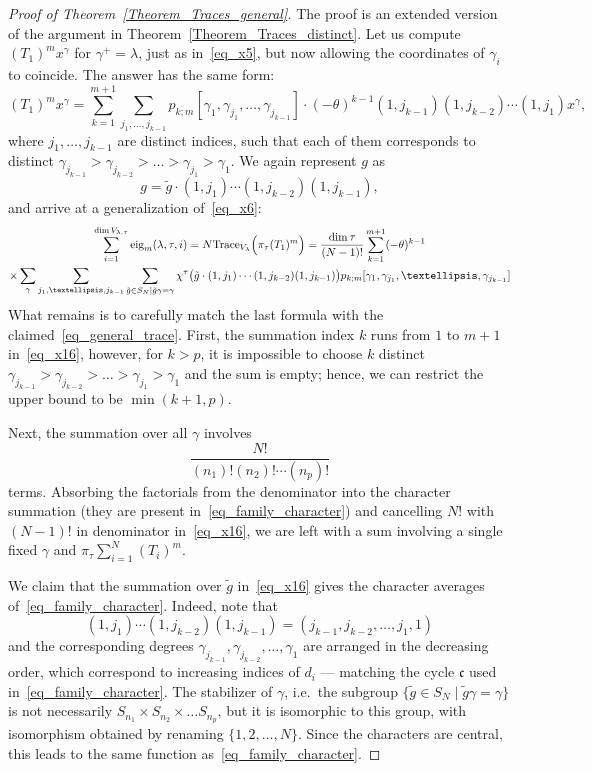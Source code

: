 \documentclass[11pt]{article}
\theoremstyle{definition}
\numberwithin{equation}{section}
\begin{document}
\begin{proof}[Proof of Theorem~\ref{Theorem_Traces_general}]
The proof is an extended version of the argument in Theorem~\ref{Theorem_Traces_distinct}. Let us compute $(T_1)^m x^{\gamma}$ for $\gamma^+=\lambda$, just as in~\eqref{eq_x5}, but now allowing the coordinates of $\gamma_i$ to coincide. The answer has the same form:
\begin{equation}
 (T_1)^m x^{\gamma}=\sum_{k=1}^{m+1}\sum_{j_1,\dots,j_{k-1}} p_{k;m}[\gamma_1,\gamma_{j_1},\dots,\gamma_{j_{k-1}}]\cdot  (-\theta)^{k-1}(1,j_{k-1})(1, j_{k-2})\cdots (1,j_{1}) x^{\gamma},
\end{equation}
where $j_1,\dots,j_{k-1}$ are distinct indices, such that each of them corresponds to distinct $\gamma_{j_{k-1}}>\gamma_{j_{k-2}}>\dots>\gamma_{j_{1}}>\gamma_1$. We again represent $g$ as
$$
 g=\tilde g\cdot  (1,j_{1})  \cdots (1,j_{k-2})(1, j_{k-1}),
$$
and arrive at a generalization of~\eqref{eq_x6}:
\begin{multline}
\label{eq_x16}
  \sum_{i=1}^{\dim V_{\lambda,\tau}} \mathrm{eig}_m(\lambda,\tau,i) =N \mathrm{Trace}_{V_{\lambda}} \Bigl( \pi_\tau (T_1)^m\Bigr)= \frac{\dim \tau}{(N-1)!}  \sum_{k=1}^{m+1} (-\theta)^{k-1}
 \\ \times \sum_{\gamma}  \sum_{j_1,\dots,j_{k-1}}  \sum_{\tilde g\in S_N\mid \tilde g\gamma=\gamma} \chi^\tau\bigl(\tilde g \cdot (1,j_{1})  \cdots (1,j_{k-2})(1, j_{k-1}) \bigr)  p_{k;m}[\gamma_1,\gamma_{j_1},\dots,\gamma_{j_{k-1}}]
\end{multline}
What remains is to carefully match the last formula with the claimed~\eqref{eq_general_trace}. First, the summation index $k$ runs from $1$ to $m+1$ in~\eqref{eq_x16}, however, for $k>p$, it is impossible to choose $k$ distinct $\gamma_{j_{k-1}}>\gamma_{j_{k-2}}>\dots>\gamma_{j_{1}}>\gamma_1$ and the sum is empty; hence, we can restrict the upper bound to be $\min(k+1,p)$.

Next, the summation over all $\gamma$ involves
$$
 \frac{N!}{(n_1)! (n_2)!\cdots (n_p)!}
$$
terms. Absorbing the factorials from the denominator into the character summation (they are present in~\eqref{eq_family_character}) and cancelling $N!$ with $(N-1)!$ in denominator in~\eqref{eq_x16}, we are left with a sum involving a single fixed $\gamma$ and $ \pi_\tau \sum_{i=1}^N (T_i)^m$.

We claim that the summation over $\tilde g$ in~\eqref{eq_x16} gives the character averages of~\eqref{eq_family_character}. Indeed, note that
$$
(1,j_{1})  \cdots (1,j_{k-2})(1, j_{k-1})=(j_{k-1}, j_{k-2},\dots,j_{1},1)
$$
and the corresponding degrees $\gamma_{j_{k-1}}, \gamma_{j_{k-2}},\dots,\gamma_{1}$ are arranged in the decreasing order, which correspond to increasing indices of $d_i$ --- matching the cycle $\mathfrak c$ used in~\eqref{eq_family_character}. The stabilizer of $\gamma$, i.e.\ the subgroup $\{\tilde g\in S_N\mid \tilde g\gamma=\gamma\}$ is not necessarily $S_{n_1}\times S_{n_2}\times \dots S_{n_p}$, but it is isomorphic to this group, with isomorphism obtained by renaming $\{1,2,\dots,N\}$. Since the characters are central, this leads to the same function as~\eqref{eq_family_character}.


\end{proof}
\end{document}
